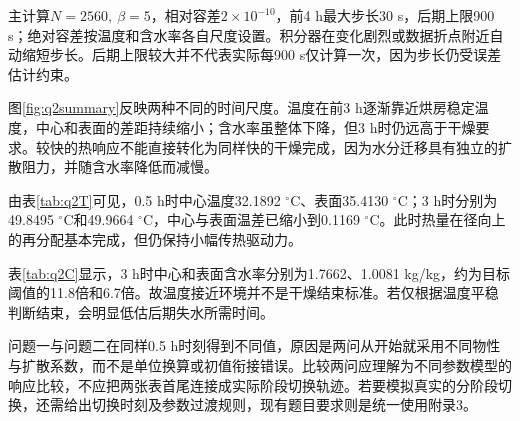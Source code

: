 主计算$N=2560,\ \beta=5$，相对容差$2\times10^{-10}$，前4 h最大步长30 s，后期上限900 s；绝对容差按温度和含水率各自尺度设置。积分器在变化剧烈或数据折点附近自动缩短步长。后期上限较大并不代表实际每900 s仅计算一次，因为步长仍受误差估计约束。


图\ref{fig:q2summary}反映两种不同的时间尺度。温度在前3 h逐渐靠近烘房稳定温度，中心和表面的差距持续缩小；含水率虽整体下降，但3 h时仍远高于干燥要求。较快的热响应不能直接转化为同样快的干燥完成，因为水分迁移具有独立的扩散阻力，并随含水率降低而减慢。





由表\ref{tab:q2T}可见，0.5 h时中心温度32.1892 $^\circ$C、表面35.4130 $^\circ$C；3 h时分别为49.8495 $^\circ$C和49.9664 $^\circ$C，中心与表面温差已缩小到0.1169 $^\circ$C。此时热量在径向上的再分配基本完成，但仍保持小幅传热驱动力。

表\ref{tab:q2C}显示，3 h时中心和表面含水率分别为1.7662、1.0081 kg/kg，约为目标阈值的11.8倍和6.7倍。故温度接近环境并不是干燥结束标准。若仅根据温度平稳判断结束，会明显低估后期失水所需时间。

问题一与问题二在同样0.5 h时刻得到不同值，原因是两问从开始就采用不同物性与扩散系数，而不是单位换算或初值衔接错误。比较两问应理解为不同参数模型的响应比较，不应把两张表首尾连接成实际阶段切换轨迹。若要模拟真实的分阶段切换，还需给出切换时刻及参数过渡规则，现有题目要求则是统一使用附录3。
